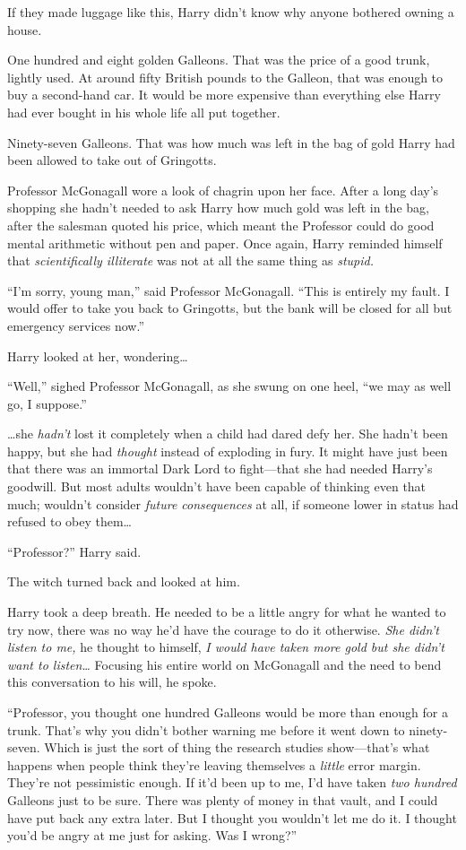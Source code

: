 If they made luggage like this, Harry didn’t know why anyone bothered owning a house.

One hundred and eight golden Galleons. That was the price of a good trunk, lightly used. At around fifty British pounds to the Galleon, that was enough to buy a second-hand car. It would be more expensive than everything else Harry had ever bought in his whole life all put together.

Ninety-seven Galleons. That was how much was left in the bag of gold Harry had been allowed to take out of Gringotts.

Professor McGonagall wore a look of chagrin upon her face. After a long day’s shopping she hadn’t needed to ask Harry how much gold was left in the bag, after the salesman quoted his price, which meant the Professor could do good mental arithmetic without pen and paper. Once again, Harry reminded himself that \emph{scientifically illiterate} was not at all the same thing as \emph{stupid.}

“I’m sorry, young man,” said Professor McGonagall. “This is entirely my fault. I would offer to take you back to Gringotts, but the bank will be closed for all but emergency services now.”

Harry looked at her, wondering…

“Well,” sighed Professor McGonagall, as she swung on one heel, “we may as well go, I suppose.”

…she \emph{hadn’t} lost it completely when a child had dared defy her. She hadn’t been happy, but she had \emph{thought} instead of exploding in fury. It might have just been that there was an immortal Dark Lord to fight—that she had needed Harry’s goodwill. But most adults wouldn’t have been capable of thinking even that much; wouldn’t consider \emph{future consequences} at all, if someone lower in status had refused to obey them…

“Professor?” Harry said.

The witch turned back and looked at him.

Harry took a deep breath. He needed to be a little angry for what he wanted to try now, there was no way he’d have the courage to do it otherwise. \emph{She didn’t listen to me,} he thought to himself, \emph{I would have taken more gold but she didn’t want to listen…} Focusing his entire world on McGonagall and the need to bend this conversation to his will, he spoke.

“Professor, you thought one hundred Galleons would be more than enough for a trunk. That’s why you didn’t bother warning me before it went down to ninety-seven. Which is just the sort of thing the research studies show—that’s what happens when people think they’re leaving themselves a \emph{little} error margin. They’re not pessimistic enough. If it’d been up to me, I’d have taken \emph{two hundred} Galleons just to be sure. There was plenty of money in that vault, and I could have put back any extra later. But I thought you wouldn’t let me do it. I thought you’d be angry at me just for asking. Was I wrong?”

